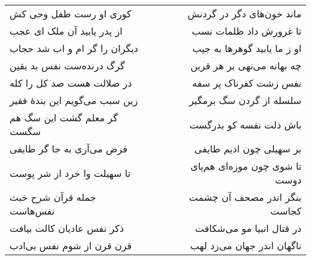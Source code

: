 \begin{center}
\begin{longtable}{l p{0.5cm} r}
کوری او رست طفل وحی کش
&&
ماند خون‌های دگر در گردنش
\\
از پدر یابید آن ملک ای عجب
&&
تا غرورش داد ظلمات نسب
\\
دیگران را گر ام و اب شد حجاب
&&
او ز ما یابید گوهرها به جیب
\\
گرگ درنده‌ست نفس بد یقین
&&
چه بهانه می‌نهی بر هر قرین
\\
در ضلالت هست صد کل را کله
&&
نفس زشت کفرناک پر سفه
\\
زین سبب می‌گویم این بندهٔ فقیر
&&
سلسله از گردن سگ برمگیر
\\
گر معلم گشت این سگ هم سگست
&&
باش ذلت نفسه کو بدرگست
\\
فرض می‌آری به جا گر طایفی
&&
بر سهیلی چون ادیم طایفی
\\
تا سهیلت وا خرد از شر پوست
&&
تا شوی چون موزه‌ای هم‌پای دوست
\\
جمله قرآن شرح خبث نفس‌هاست
&&
بنگر اندر مصحف آن چشمت کجاست
\\
ذکر نفس عادیان کالت بیافت
&&
در قتال انبیا مو می‌شکافت
\\
قرن قرن از شوم نفس بی‌ادب
&&
ناگهان اندر جهان می‌زد لهب
\\
\end{longtable}
\end{center}
